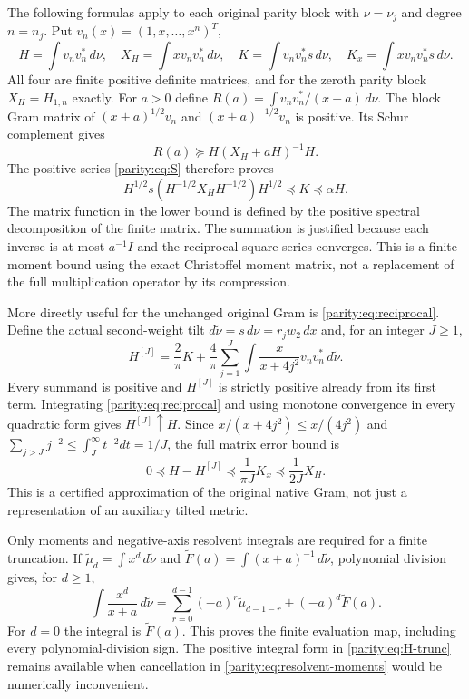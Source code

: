\documentclass[11pt]{article}
\begin{document}
The following formulas apply to each original parity block with
$\nu=\nu_j$ and degree $n=n_j$. Put $v_n(x)=(1,x,\ldots,x^n)^T$,
\[
 H=\int v_nv_n^*\,d\nu,\quad
 X_H=\int x v_nv_n^*\,d\nu,\quad
 K=\int v_nv_n^*s\,d\nu,\quad
 K_x=\int x v_nv_n^*s\,d\nu.
\]
All four are finite positive definite matrices, and for the
zeroth parity block $X_H=H_{1,n}$ exactly. For $a>0$ define
$R(a)=\int v_nv_n^*/(x+a)\,d\nu$. The block Gram matrix of
$(x+a)^{1/2}v_n$ and $(x+a)^{-1/2}v_n$ is positive. Its Schur
complement gives
\begin{equation}\label{parity:eq:resolvent-compression}
 R(a)\succeq H(X_H+aH)^{-1}H.
\end{equation}
The positive series \eqref{parity:eq:S} therefore proves
\begin{equation}\label{parity:eq:finite-S}
 H^{1/2}s(H^{-1/2}X_HH^{-1/2})H^{1/2}
       \preceq K\preceq\alpha H.
\end{equation}
The matrix function in the lower bound is defined by the positive
spectral decomposition of the finite matrix. The summation is
justified because each inverse is at most $a^{-1}I$ and the
reciprocal-square series converges. This is a finite-moment
bound using the exact Christoffel moment matrix, not a replacement
of the full multiplication operator by its compression.

More directly useful for the unchanged original Gram is
\eqref{parity:eq:reciprocal}. Define the actual second-weight tilt
$d\widetilde\nu=s\,d\nu=r_jw_2\,dx$ and, for an integer $J\geq1$,
\begin{equation}\label{parity:eq:H-trunc}
 H^{[J]}=\frac2\pi K+\frac4\pi\sum_{j=1}^J
       \int\frac{x}{x+4j^2}v_nv_n^*\,d\widetilde\nu.
\end{equation}
Every summand is positive and $H^{[J]}$ is strictly positive
already from its first term. Integrating \eqref{parity:eq:reciprocal}
and using monotone convergence in every quadratic form gives
$H^{[J]}\uparrow H$. Since
$x/(x+4j^2)\leq x/(4j^2)$ and
$\sum_{j>J}j^{-2}\leq\int_J^\infty t^{-2}dt=1/J$, the full
matrix error bound is
\begin{equation}\label{parity:eq:H-error}
 \boxed{0\preceq H-H^{[J]}\preceq\frac1{\pi J}K_x
                                      \preceq\frac1{2J}X_H.}
\end{equation}
This is a certified approximation of the original native Gram,
not just a representation of an auxiliary tilted metric.

Only moments and negative-axis resolvent integrals are required
for a finite truncation. If
$\widetilde\mu_d=\int x^d\,d\widetilde\nu$ and
$\widetilde F(a)=\int(x+a)^{-1}\,d\widetilde\nu$, polynomial
division gives, for $d\geq1$,
\begin{equation}\label{parity:eq:resolvent-moments}
 \int\frac{x^d}{x+a}\,d\widetilde\nu
 =\sum_{r=0}^{d-1}(-a)^r\widetilde\mu_{d-1-r}
                  +(-a)^d\widetilde F(a).
\end{equation}
For $d=0$ the integral is $\widetilde F(a)$. This proves the
finite evaluation map, including every polynomial-division sign.
The positive integral form in \eqref{parity:eq:H-trunc} remains available
when cancellation in \eqref{parity:eq:resolvent-moments} would be
numerically inconvenient.
\end{document}
